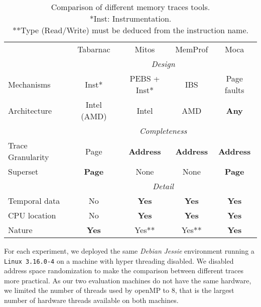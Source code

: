 \begin{table}[htb]
    \centering
    \begin{tabular}{lcccc}
        \toprule
            & Tabarnac & Mitos & MemProf & Moca \\
            \cmidrule(lr){2-5}
            & \multicolumn{4}{c}{\emph{Design}} \\
            \cmidrule(lr){2-5}
            Mechanisms   & Inst* & PEBS + Inst* & IBS & Page faults \\
            Architecture & Intel (AMD) & Intel & AMD & \textbf{Any} \\
            \cmidrule(lr){2-5}
            & \multicolumn{4}{c}{\emph{Completeness}} \\
            \cmidrule(lr){2-5}
            Trace Granularity & Page          & \textbf{Address} & \textbf{Address} & \textbf{Address} \\
            Superset          & \textbf{Page} & None             & None             & \textbf{Page} \\
            \cmidrule(lr){2-5}
            & \multicolumn{4}{c}{\emph{Detail}} \\
            \cmidrule(lr){2-5}
            Temporal data & No          & \textbf{Yes} & \textbf{Yes} & \textbf{Yes} \\
            CPU location  & No          & \textbf{Yes} & \textbf{Yes} & \textbf{Yes} \\
            Nature        &\textbf{Yes} & Yes**         & Yes**         & \textbf{Yes} \\
        \bottomrule
    \end{tabular}
    \caption[Comparison of different memory traces tools.]
    {Comparison of different memory traces tools.\\
        *Inst: Instrumentation.\\
        **Type (Read/Write) must be deduced from the instruction name.}
        \label{tab:tools-comp}
\end{table}


For each experiment, we deployed the same \emph{Debian} \emph{Jessie}
environment running a \texttt{Linux 3.16.0-4} on a machine with hyper threading
disabled. We disabled address space randomization to make the comparison between different
traces more practical. 
As our two evaluation machines do not have the same hardware,
we limited the number of threads used by openMP to $8$,
that is the largest number of hardware threads available on both machines.


